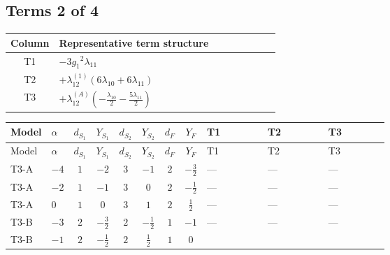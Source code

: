 \documentclass[8pt]{article}
\begin{document}
\begin{landscape}
\subsection*{Terms 2 of 4}
\begin{center}
\begin{tabular}{@{}c >{\raggedright\arraybackslash}p{0.82\linewidth}@{}}
\toprule
Column & Representative term structure \\
\midrule
T1 & \(\displaystyle -3 {g_1}^2 {\lambda_{11}}\) \\
\midrule
T2 & \(\displaystyle +{\lambda_{12}^{(1)}} (6 {\lambda_{10}}+6 {\lambda_{11}})\) \\
\midrule
T3 & \(\displaystyle +{\lambda_{12}^{(A)}} \left(-\frac{{\lambda_{10}}}{2}-\frac{5 {\lambda_{11}}}{2}\right)\) \\
\midrule
\bottomrule
\end{tabular}
\end{center}
\smallskip
\tiny
\begin{longtable}{@{}llcccccc >{\raggedright\arraybackslash}p{0.21\linewidth} >{\raggedright\arraybackslash}p{0.21\linewidth} >{\raggedright\arraybackslash}p{0.21\linewidth}@{}}
\toprule
Model & $\alpha$ & $d_{S_1}$ & $Y_{S_1}$ & $d_{S_2}$ & $Y_{S_2}$ & $d_F$ & $Y_F$ & T1 & T2 & T3 \\
\midrule
\endfirsthead
\toprule
Model & $\alpha$ & $d_{S_1}$ & $Y_{S_1}$ & $d_{S_2}$ & $Y_{S_2}$ & $d_F$ & $Y_F$ & T1 & T2 & T3 \\
\midrule
\endhead
T3-A & $-4$ & $1$ & $-2$ & $3$ & $-1$ & $2$ & $-\frac{3}{2}$ & --- & --- & --- \\
\midrule
T3-A & $-2$ & $1$ & $-1$ & $3$ & $0$ & $2$ & $-\frac{1}{2}$ & --- & --- & --- \\
\midrule
T3-A & $0$ & $1$ & $0$ & $3$ & $1$ & $2$ & $\frac{1}{2}$ & --- & --- & --- \\
\midrule
T3-B & $-3$ & $2$ & $-\frac{3}{2}$ & $2$ & $-\frac{1}{2}$ & $1$ & $-1$ & --- & --- & --- \\
\midrule
T3-B & $-1$ & $2$ & $-\frac{1}{2}$ & $2$ & $\frac{1}{2}$ & $1$ & $0$ & \scriptsize\adjustbox{max width=\linewidth}{$\begin{gathered} -3 {g_1}^2 {\lambda_{11}}\end{gathered}$} & \scriptsize\adjustbox{max width=\linewidth}{$\begin{gathered} +{\lambda_{12}^{(1)}} (6 {\lambda_{10}}+6 {\lambda_{11}})\end{gathered}$} & \scriptsize\adjustbox{max width=\linewidth}{$\begin{gathered} +{\lambda_{12}^{(A)}} \left(-\frac{{\lambda_{10}}}{2}-\frac{5 {\lambda_{11}}}{2}\right)\end{gathered}$} \\

\end{longtable}
\end{landscape}
\end{document}
